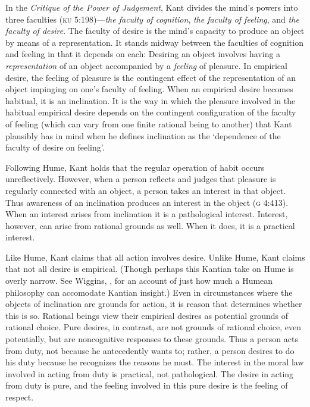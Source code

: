 \documentclass[a4paper,12pt]{article}
\begin{document}
In the \emph{Critique of the Power of Judgement}, Kant divides the mind's powers into three faculties (\textsc{ku} 5:198)---\emph{the faculty of cognition}, \emph{the faculty of feeling}, and \emph{the faculty of desire}. The faculty of desire is the mind's capacity to produce an object by means of a representation. It stands midway between the faculties of cognition and feeling in that it depends on each: Desiring an object involves having a \emph{representation} of an object accompanied by a \emph{feeling} of pleasure. In empirical desire, the feeling of pleasure is the contingent effect of the representation of an object impinging on one's faculty of feeling. When an empirical desire becomes habitual, it is an inclination. It is the way in which the pleasure involved in the habitual empirical desire depends on the contingent configuration of the faculty of feeling (which can vary from one finite rational being to another) that Kant plausibly has in mind when he defines inclination as the `dependence of the faculty of desire on feeling'.

Following Hume, Kant holds that the regular operation of habit occurs unreflectively. However, when a person reflects and judges that pleasure is regularly connected with an object, a person takes an interest in that object. Thus awareness of an inclination produces an interest in the object (\textsc{g} 4:413). When an interest arises from inclination it is a pathological interest. Interest, however, can arise from rational grounds as well. When it does, it is a practical interest.

Like Hume, Kant claims that all action involves desire. Unlike Hume, Kant claims that not all desire is empirical. (Though perhaps this Kantian take on Hume is overly narrow. See Wiggins, \citeyear{Wiggins:1995fk}, for an account of just how much a Humean philosophy can accomodate Kantian insight.) Even in circumstances where the objects of inclination are grounds for action, it is reason that determines whether this is so. Rational beings view their empirical desires as potential grounds of rational choice. Pure desires, in contrast, are not grounds of rational choice, even potentially, but are noncognitive responses to these grounds. Thus a person acts from duty, not because he antecedently wants to; rather, a person desires to do his duty because he recognizes the reasons he must. The interest in the moral law involved in acting from duty is practical, not pathological. The desire in acting from duty is pure, and the feeling involved in this pure desire is the feeling of respect.
\end{document}

